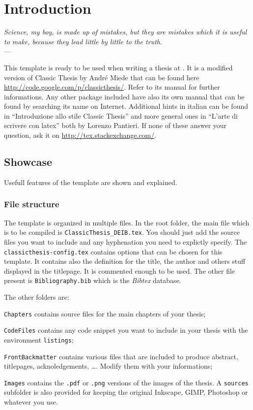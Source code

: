 \chapter{Introduction}
\label{chap:aChapter}
\begin{flushright}{\slshape    
   Science, my boy, is made up of mistakes, but they are mistakes
   which it is useful to make, because they lead little by little
   to the truth}. \\ \medskip --- \citeauthor{verne_journey:1957}
\end{flushright} 

This template is ready to be used when writing a thesis at
\myDepartment. It is a modified version of Classic Thesis by
Andr\'e Miede that can be found here
\url{http://code.google.com/p/classicthesis/}. Refer to its manual
for further informations. Any other package included have also its
own manual that can be found by searching its name on Internet.
Additional hints in italian can be found in \enquote{Introduzione
allo stile Classic Thesis} and more general ones in \enquote{L'arte di
scrivere con latex} both by Lorenzo Pantieri. If none of these
answer your question, ask it on
\url{http://tex.stackexchange.com/}.

\section{Showcase}
Usefull features of the template are shown and explained.

\subsection{File structure}
The template is organized in multiple files. In the root folder,
the main file which is to be compiled is
\verb!ClassicThesis_DEIB.tex!. You should just add the source
files you want to include and any hyphenation you need to
explictly specify. The \verb!classicthesis-config.tex! contains
options that can be chosen for this template. It contains also
the definition for the title, the author and others stuff
displayed in the titlepage. It is commented enough to be used.
The other file present is \verb!Bibliography.bib! which is the
\emph{Bibtex} database.

The other folders are:
\begin{aenumerate}
	\item \verb!Chapters! contains source files for the main chapters
	of your thesis;
	\item \verb!CodeFiles! contains any code snippet you want to
	include in your thesis with the environment \verb!listings!;
	\item \verb!FrontBackmatter! contains various files that are
	included to produce abstract, titlepages, acknoledgements,
	\ldots. Modify them with your informations;
	\item \verb!Images! contains the \verb!.pdf! or \verb!.png!
	versions of the images of the thesis. A \verb!sources! subfolder
	is also provided for keeping the original Inkscape, GIMP,
	Photoshop or whatever you use.
\end{aenumerate}

